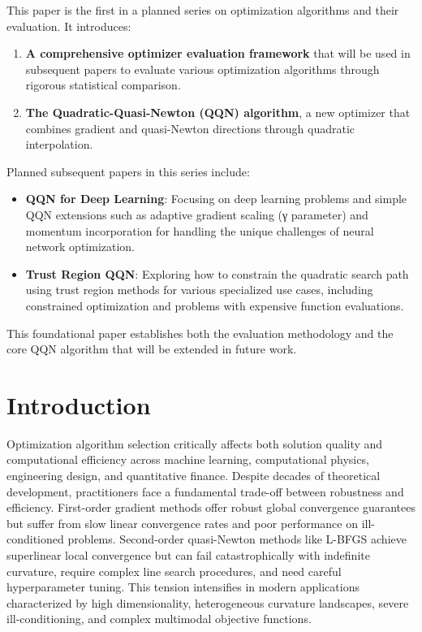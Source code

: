 This paper is the first in a planned series on optimization algorithms and their evaluation. It introduces:

\begin{enumerate}
\def\labelenumi{\arabic{enumi}.}
\tightlist
\item
  \textbf{A comprehensive optimizer evaluation framework} that will be used in subsequent papers to evaluate various optimization algorithms through rigorous statistical comparison.
\item
  \textbf{The Quadratic-Quasi-Newton (QQN) algorithm}, a new optimizer that combines gradient and quasi-Newton directions through quadratic interpolation.
\end{enumerate}

Planned subsequent papers in this series include:

\begin{itemize}
\tightlist
\item
  \textbf{QQN for Deep Learning}: Focusing on deep learning problems and simple QQN extensions such as adaptive gradient scaling (γ parameter) and momentum incorporation for handling the unique challenges of neural network optimization.
\item
  \textbf{Trust Region QQN}: Exploring how to constrain the quadratic search path using trust region methods for various specialized use cases, including constrained optimization and problems with expensive function evaluations.
\end{itemize}

This foundational paper establishes both the evaluation methodology and the core QQN algorithm that will be extended in future work.

\hypertarget{introduction}{%
\section{Introduction}\label{introduction}}

Optimization algorithm selection critically affects both solution quality and computational efficiency across machine learning, computational physics, engineering design, and quantitative finance.
Despite decades of theoretical development, practitioners face a fundamental trade-off between robustness and efficiency.
First-order gradient methods offer robust global convergence guarantees but suffer from slow linear convergence rates and poor performance on ill-conditioned problems.
Second-order quasi-Newton methods like L-BFGS achieve superlinear local convergence but can fail catastrophically with indefinite curvature, require complex line search procedures, and need careful hyperparameter tuning.
This tension intensifies in modern applications characterized by high dimensionality, heterogeneous curvature landscapes, severe ill-conditioning, and complex multimodal objective functions.

